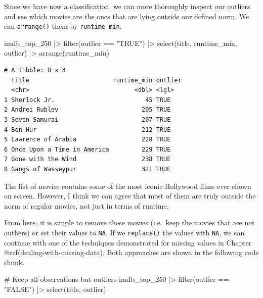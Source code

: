 \documentclass[
  letterpaper,
]{krantz}
\makeatletter
\newenvironment{Shaded}{\begin{snugshade}}{\end{snugshade}}
\newcommand{\CommentTok}[1]{\textcolor[rgb]{0.37,0.37,0.37}{#1}}
\newcommand{\FunctionTok}[1]{\textcolor[rgb]{0.28,0.35,0.67}{#1}}
\newcommand{\NormalTok}[1]{\textcolor[rgb]{0.00,0.23,0.31}{#1}}
\newcommand{\SpecialCharTok}[1]{\textcolor[rgb]{0.37,0.37,0.37}{#1}}
\newcommand{\StringTok}[1]{\textcolor[rgb]{0.13,0.47,0.30}{#1}}
\newenvironment{kframe}{%
\medskip{}
\setlength{\fboxsep}{.8em}
 \def\at@end@of@kframe{}%
 \ifinner\ifhmode%
  \def\at@end@of@kframe{\end{minipage}}%
  \begin{minipage}{\columnwidth}%
 \fi\fi%
 \def\FrameCommand##1{\hskip\@totalleftmargin \hskip-\fboxsep
 \colorbox{shadecolor}{##1}\hskip-\fboxsep
     \hskip-\linewidth \hskip-\@totalleftmargin \hskip\columnwidth}%
 \MakeFramed {\advance\hsize-\width
   \@totalleftmargin\z@ \linewidth\hsize
   \@setminipage}}%
 {\par\unskip\endMakeFramed%
 \at@end@of@kframe}
\renewenvironment{Shaded}{\begin{kframe}}{\end{kframe}}
\makeatother
\begin{document}
Since we have now a classification, we can more thoroughly inspect our
outliers and see which movies are the ones that are lying outside our
defined norm. We can \texttt{arrange()} them by \texttt{runtime\_min}.

\begin{Shaded}
\begin{Highlighting}[]
\NormalTok{imdb\_top\_250 }\SpecialCharTok{|\textgreater{}}
  \FunctionTok{filter}\NormalTok{(outlier }\SpecialCharTok{==} \StringTok{"TRUE"}\NormalTok{) }\SpecialCharTok{|\textgreater{}}
  \FunctionTok{select}\NormalTok{(title, runtime\_min, outlier) }\SpecialCharTok{|\textgreater{}}
  \FunctionTok{arrange}\NormalTok{(runtime\_min)}
\end{Highlighting}
\end{Shaded}

\begin{verbatim}
# A tibble: 8 x 3
  title                       runtime_min outlier
  <chr>                             <dbl> <lgl>  
1 Sherlock Jr.                         45 TRUE   
2 Andrei Rublev                       205 TRUE   
3 Seven Samurai                       207 TRUE   
4 Ben-Hur                             212 TRUE   
5 Lawrence of Arabia                  228 TRUE   
6 Once Upon a Time in America         229 TRUE   
7 Gone with the Wind                  238 TRUE   
8 Gangs of Wasseypur                  321 TRUE   
\end{verbatim}

The list of movies contains some of the most iconic Hollywood films ever
shown on screen. However, I think we can agree that most of them are
truly outside the norm of regular movies, not just in terms of runtime.

From here, it is simple to remove these movies (i.e.~keep the movies
that are not outliers) or set their values to \texttt{NA}. If we
\texttt{replace()} the values with \texttt{NA}, we can continue with one
of the techniques demonstrated for missing values in Chapter
@ref(dealing-with-missing-data). Both approaches are shown in the
following code chunk.

\begin{Shaded}
\begin{Highlighting}[]
\CommentTok{\# Keep all observations but outliers}
\NormalTok{imdb\_top\_250 }\SpecialCharTok{|\textgreater{}}
  \FunctionTok{filter}\NormalTok{(outlier }\SpecialCharTok{==} \StringTok{"FALSE"}\NormalTok{) }\SpecialCharTok{|\textgreater{}}
  \FunctionTok{select}\NormalTok{(title, outlier)}
\end{Highlighting}
\end{Shaded}
\end{document}
